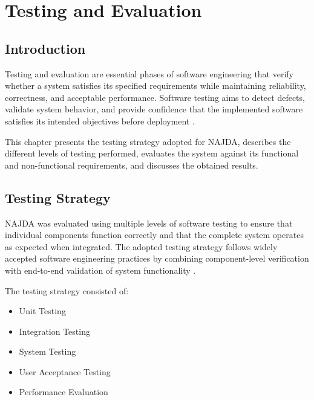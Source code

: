 \chapter{Testing and Evaluation}
\label{chap:testing}

\section{Introduction}

Testing and evaluation are essential phases of software engineering that verify whether a system satisfies its specified requirements while maintaining reliability, correctness, and acceptable performance. Software testing aims to detect defects, validate system behavior, and provide confidence that the implemented software satisfies its intended objectives before deployment \cite{pressman2020se,sommerville2016software}.

This chapter presents the testing strategy adopted for NAJDA, describes the different levels of testing performed, evaluates the system against its functional and non-functional requirements, and discusses the obtained results.


\section{Testing Strategy}

NAJDA was evaluated using multiple levels of software testing to ensure that individual components function correctly and that the complete system operates as expected when integrated. The adopted testing strategy follows widely accepted software engineering practices by combining component-level verification with end-to-end validation of system functionality \cite{pressman2020se,istqb}.

The testing strategy consisted of:

\begin{itemize}
    \item Unit Testing
    \item Integration Testing
    \item System Testing
    \item User Acceptance Testing
    \item Performance Evaluation
\end{itemize}


